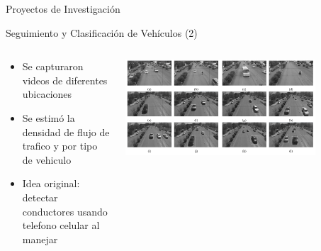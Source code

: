 \begin{frame}{Proyectos de Investigación}
\begin{block}{Seguimiento y Clasificación de Vehículos (2)} 
\begin{columns}
\begin{column}{0.4\textwidth}
		\begin{itemize}
		\item Se capturaron videos de diferentes ubicaciones
		\item Se estimó la densidad de flujo de trafico y por tipo de vehiculo
		\item Idea original: detectar conductores usando telefono celular al manejar
		\end{itemize}
\end{column}
\begin{column}{0.6\textwidth}  
    \begin{center}
     \includegraphics[width=0.8\textwidth]{Figs/TrafficFlow2}
     \end{center}
\end{column}
\end{columns}
\end{block} 
\setcounter{footnote}{0}
\end{frame}





